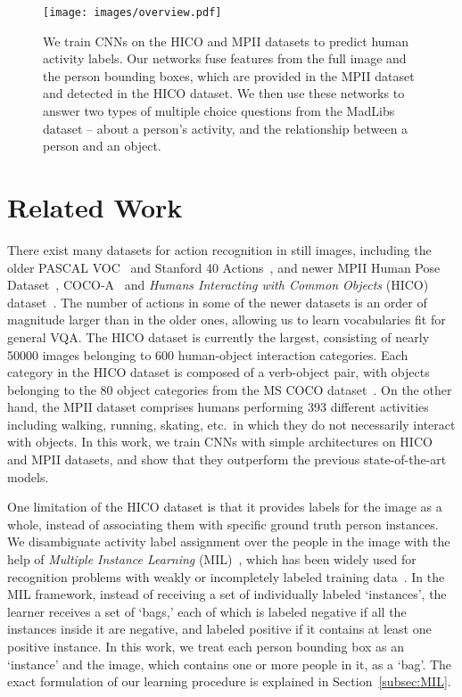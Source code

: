\documentclass[runningheads]{llncs}
\begin{document}
\vspace{-5mm}
\begin{figure}[h!]
    \centering
    \texttt{[image: images/overview.pdf]}
    \caption{We train CNNs on the HICO and MPII datasets to predict human activity labels. Our networks fuse features from the full image and the person bounding boxes, which are provided in the MPII dataset and detected in the HICO dataset. 
    We then use these networks to answer two types of multiple choice questions from the MadLibs dataset -- about a person's activity, and the relationship between a person and an object.}
    \label{fig:overview}
\end{figure}

%
 

\section{Related Work}
\label{related_work}

There exist many datasets for action recognition in still images, including the older PASCAL VOC~\cite{everingham2010pascal} and Stanford 40 Actions~\cite{yao2011human}, and newer MPII Human Pose Dataset~\cite{pishchulin2014fine}, COCO-A~\cite{ronchi2015COCOA} and \emph{Humans Interacting with Common Objects} (HICO) dataset~\cite{chao2015hico}. The number of actions in some of the newer datasets is an order of magnitude larger than in the older ones, allowing us to learn vocabularies fit for general VQA. The HICO dataset is currently the largest, consisting of nearly 50000 images belonging to 600 human-object interaction categories. Each category in the HICO dataset is composed of a verb-object pair, with objects belonging to the 80 object categories from the MS COCO dataset~\cite{lin2014microsoft}. On the other hand, the MPII dataset comprises humans performing 393 different activities including walking, running, skating, etc.\ in which they do not necessarily interact with objects. In this work, we train CNNs with simple architectures on HICO and MPII datasets, and show that they outperform the previous state-of-the-art models.

One limitation of the HICO dataset is that it provides labels for the image as a whole, instead of associating them with specific ground truth person instances. We disambiguate activity label assignment over the people in the image with the help of \emph{Multiple Instance Learning} (MIL)~\cite{maron1998MIL}, which has been widely used for recognition problems with weakly or incompletely labeled training data~\cite{zhang2005multiple,hoffman2015detector,vezhnevets2010towards,pinheiro2015image}. In the MIL framework, instead of receiving a set of individually labeled `instances', the learner receives a set of `bags,' each of which is labeled negative if all the instances inside it are negative, and labeled positive if it contains at least one positive instance. In this work, we treat each person bounding box as an `instance' and the image, which contains one or more people in it, as a `bag'. The exact formulation of our learning procedure is explained in Section~\ref{subsec:MIL}.
\end{document}
